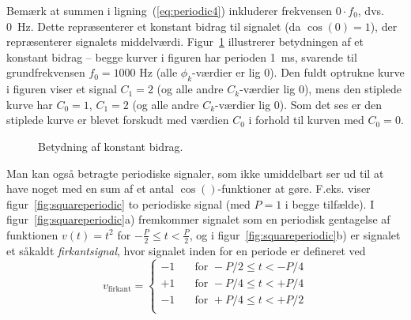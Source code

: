 \documentclass[11pt,a4paper]{article}
\begin{document}
\noindent{}Bemærk at summen i ligning~(\ref{eq:periodic4}) inkluderer frekvensen $0\cdot{}f_0$, dvs. 0~Hz. Dette repræsenterer et konstant bidrag til signalet (da $\cos(0)=1$), der repræsenterer signalets middelværdi. Figur~\ref{fig:cossignal2} illustrerer betydningen af et konstant bidrag -- begge kurver i figuren har perioden 1~ms, svarende til grundfrekvensen $f_0=1000\textrm{ Hz}$ (alle $\phi_k$-værdier er lig 0). Den fuldt optrukne kurve i figuren viser et signal $C_1=2$ (og alle andre $C_k$-værdier lig 0), mens den stiplede kurve har $C_0=1$, $C_1=2$ (og alle andre $C_k$-værdier lig 0). Som det ses er den stiplede kurve er blevet forskudt med værdien $C_0$ i forhold til kurven med $C_0=0$.
\begin{figure}[htbp]
\centering
{}
\caption{\label{fig:cossignal2}Betydning af konstant bidrag.}
\end{figure}

Man kan også betragte periodiske signaler, som ikke umiddelbart ser ud til at have noget med en sum af et antal $\cos()$-funktioner at gøre. F.eks. viser figur~\ref{fig:squareperiodic} to periodiske signal (med $P=1$ i begge tilfælde). I figur~\ref{fig:squareperiodic}a) fremkommer signalet som en periodisk gentagelse af funktionen $v(t)=t^{2}$ for $-\frac{P}{2}\le{}t<\frac{P}{2}$, og i figur~\ref{fig:squareperiodic}b) er signalet et såkaldt \emph{firkantsignal}, hvor signalet inden for en periode er defineret ved
\begin{equation}
v_{\textrm{firkant}}=
\begin{cases}
-1 & \quad \text{for } -P/2 \leq t < -P/4 \\
+1 & \quad \text{for } -P/4 \leq t < +P/4 \\
-1 & \quad \text{for } +P/4 \leq t < +P/2 \\
\end{cases}
\end{equation}
\end{document}
